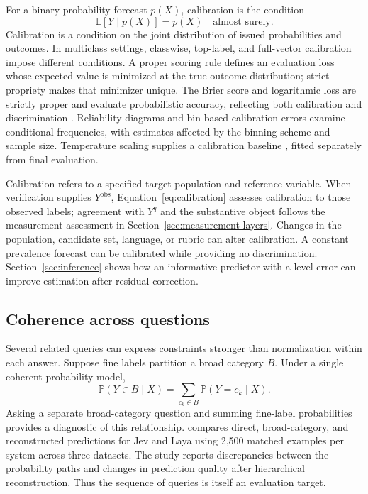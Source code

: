 \documentclass[11pt,a4paper]{article}
\newcommand{\E}{\mathbb{E}}
\newcommand{\Prob}{\mathbb{P}}
\begin{document}
For a binary probability forecast $p(X)$, calibration is the condition
\begin{equation}
 \E[Y\mid p(X)]=p(X)\quad\text{almost surely}.
 \label{eq:calibration}
\end{equation}
Calibration is a condition on the joint distribution of issued probabilities and outcomes. In multiclass settings, classwise, top-label, and full-vector calibration impose different conditions. A proper scoring rule defines an evaluation loss whose expected value is minimized at the true outcome distribution; strict propriety makes that minimizer unique. The Brier score and logarithmic loss are strictly proper and evaluate probabilistic accuracy, reflecting both calibration and discrimination \citep{gneiting2007}. Reliability diagrams and bin-based calibration errors examine conditional frequencies, with estimates affected by the binning scheme and sample size. Temperature scaling supplies a calibration baseline \citep{guo2017}, fitted separately from final evaluation.

Calibration refers to a specified target population and reference variable. When verification supplies $Y^{\mathrm{obs}}$, Equation~\eqref{eq:calibration} assesses calibration to those observed labels; agreement with $Y^q$ and the substantive object follows the measurement assessment in Section~\ref{sec:measurement-layers}. Changes in the population, candidate set, language, or rubric can alter calibration. A constant prevalence forecast can be calibrated while providing no discrimination. Section~\ref{sec:inference} shows how an informative predictor with a level error can improve estimation after residual correction.

\subsection{Coherence across questions}

Several related queries can express constraints stronger than normalization within each answer. Suppose fine labels partition a broad category $B$. Under a single coherent probability model,
\begin{equation}
 \Prob(Y\in B\mid X)=\sum_{c_k\in B}\Prob(Y=c_k\mid X).
 \label{eq:coherence}
\end{equation}
Asking a separate broad-category question and summing fine-label probabilities provides a diagnostic of this relationship. \citet{joy2026} compares direct, broad-category, and reconstructed predictions for Jev and Laya using 2,500 matched examples per system across three datasets. The study reports discrepancies between the probability paths and changes in prediction quality after hierarchical reconstruction. Thus the sequence of queries is itself an evaluation target.
\end{document}
